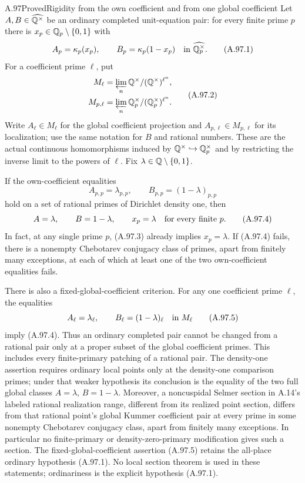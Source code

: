 \begin{statement}{A.97}{Proved}{Rigidity from the own coefficient and from one global coefficient}
Let $A,B\in\widehat{\mathbb Q^\times}$ be an ordinary completed
unit-equation pair: for every finite prime $p$ there is
$x_p\in\mathbb Q_p\setminus\{0,1\}$ with
\[
       A_p=\kappa_p(x_p),\qquad
       B_p=\kappa_p(1-x_p)
             \quad\hbox{in }\widehat{\mathbb Q_p^\times}.
\tag{A.97.1}
\]
For a coefficient prime $\ell$, put
\[
 \begin{split}
 M_\ell&=\varprojlim_n\mathbb Q^\times/(\mathbb Q^\times)^{\ell^n},\\
 M_{p,\ell}&=\varprojlim_n
                 \mathbb Q_p^\times/(\mathbb Q_p^\times)^{\ell^n}.
 \end{split}
\tag{A.97.2}
\]
Write $A_\ell\in M_\ell$ for the global coefficient
projection and $A_{p,\ell}\in M_{p,\ell}$ for its
localization; use the same notation for $B$ and rational
numbers.  These are the actual continuous homomorphisms
induced by $\mathbb Q^\times\hookrightarrow\mathbb Q_p^\times$ and by
restricting the inverse limit to the powers of $\ell$.
Fix $\lambda\in\mathbb Q\setminus\{0,1\}$.

If the own-coefficient equalities
\[
             A_{p,p}=\lambda_{p,p},\qquad
             B_{p,p}=(1-\lambda)_{p,p}
\tag{A.97.3}
\]
hold on a set of rational primes of Dirichlet density one,
then
\[
               A=\lambda,\qquad B=1-\lambda,
                    \qquad x_p=\lambda
                         \quad\hbox{for every finite }p.
\tag{A.97.4}
\]
In fact, at any single prime $p$, (A.97.3) already implies
$x_p=\lambda$.  If (A.97.4) fails, there is a nonempty
Chebotarev conjugacy class of primes, apart from finitely
many exceptions, at each of which at least one of the two
own-coefficient equalities fails.

There is also a fixed-global-coefficient criterion.
For any one coefficient prime $\ell$, the equalities
\[
                   A_\ell=\lambda_\ell,
                \qquad B_\ell=(1-\lambda)_\ell
                           \quad\hbox{in }M_\ell
\tag{A.97.5}
\]
imply (A.97.4).  Thus an ordinary completed pair cannot be
changed from a rational pair only at a proper subset of
the global coefficient primes.  This includes every
finite-primary patching of a rational pair.
The density-one assertion requires ordinary local points
only at the density-one comparison primes; under that
weaker hypothesis its conclusion is the equality of
the two full global classes $A=\lambda$, $B=1-\lambda$.
Moreover, a noncuspidal Selmer section in A.14's labeled
rational realization range, different from its realized
point section, differs from that rational point's global
Kummer coefficient pair at every prime in some nonempty
Chebotarev conjugacy class, apart from finitely many
exceptions.  In particular no finite-primary or
density-zero-primary modification gives such a section.
The fixed-global-coefficient assertion (A.97.5) retains
the all-place ordinary hypothesis (A.97.1).
No local section theorem is used in these statements;
ordinariness is the explicit hypothesis (A.97.1).
\end{statement}
